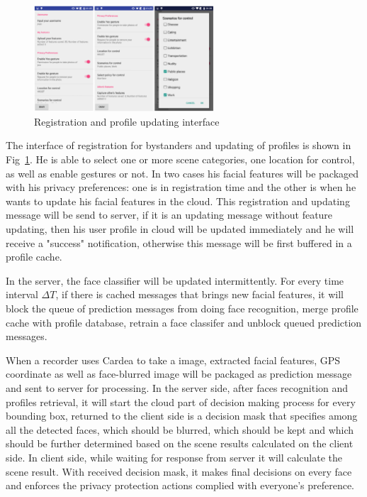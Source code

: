 \begin{description}[leftmargin=0cm]

\begin{figure}[!htbp]
    \centering
    \includegraphics[width=0.6\textwidth]{figure/ch4-reg.png}
    \caption{Registration and profile updating interface}
    \label{fig:ch4-reg}
\end{figure}

  \item[{Registration and Profile updating:}] The interface of registration for bystanders and updating of profiles is shown in Fig~\ref{fig:ch4-reg}. He is able to select one or more scene categories, one location for control, as well as enable gestures or not. In two cases his facial features will be packaged with his privacy preferences: one is in registration time and the other is when he wants to update his facial features in the cloud. This registration and updating message will be send to server, if it is an updating message without feature updating, then his user profile in cloud will be updated immediately and he will receive a "success" notification, otherwise this message will be first buffered in a profile cache.

  \item[{Face classifier updating:}] In the server, the face classifier will be updated intermittently. For every time interval $\Delta T$, if there is cached messages that brings new facial features, it will  block the queue of prediction messages from doing face recognition,  merge profile cache with profile database,  retrain a face classifer and  unblock queued prediction messages.

  \item[{Image capturing:}] When a recorder uses Cardea to take a image, extracted facial features, GPS coordinate as well as face-blurred image will be packaged as prediction message and sent to server for processing. In the server side, after faces recognition and profiles retrieval, it will start the cloud part of decision making process for every bounding box, returned to the client side is a decision mask that specifies among all the detected faces, which should be blurred, which should be kept and which should be further determined based on the scene results calculated on the client side. In client side, while waiting for response from server it will calculate the scene result. With received decision mask, it makes final decisions on every face and enforces the privacy protection actions complied with everyone's preference.


\end{description}
